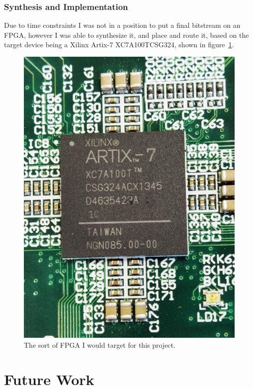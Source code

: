 \documentclass[12pt]{article}
\begin{document}
\subsubsection{Synthesis and Implementation}

Due to time constraints I was not in a position to put a final bitstream on an FPGA, however I was able to synthesize it, and place and route it, based on the target device being a Xilinx Artix-7 XC7A100TCSG324, shown in figure~\ref{tim_xilinx}.

\begin{figure}[thp]
	\centering
	
	\includegraphics[width=\textwidth]{tim_xilinx.jpg}
	
	\caption{The sort of FPGA I would target for this project.}
	\label{tim_xilinx}
\end{figure}

\section{Future Work}
\end{document}
